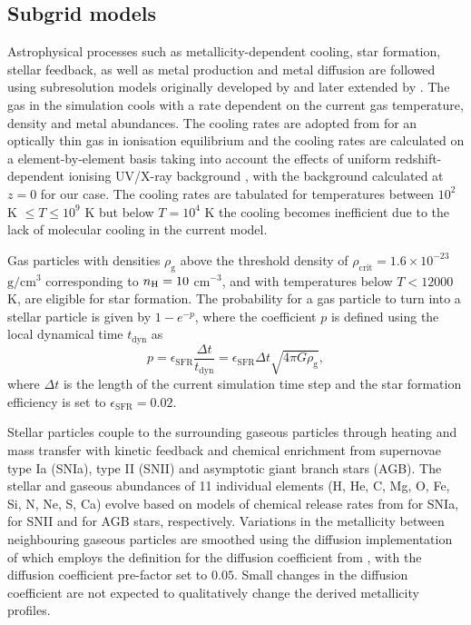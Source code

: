 \documentclass[a4paper,fleqn,usenatbib]{mnras}
\begin{document}
\subsection{Subgrid models}

Astrophysical processes such as metallicity-dependent cooling, star formation, 
stellar feedback, as well as metal production and metal diffusion are followed using 
subresolution models originally developed by  \citet{2005MNRAS.364..552S, 2006MNRAS.371.1125S}
and later extended by \citet{2013MNRAS.434.3142A}.
The gas in the simulation cools with a rate dependent on the current gas temperature, density and 
metal abundances. The cooling rates are adopted from \citet{2009MNRAS.393...99W} \citep[see also][]{2013MNRAS.434.3142A} for an 
optically thin gas in ionisation equilibrium and the cooling rates are calculated on a element-by-element basis taking
into account the effects of uniform redshift-dependent ionising UV/X-ray background \citet{2001cghr.confE..64H}, with 
the background calculated at $z=0$ for our case. The cooling rates are tabulated for temperatures between $10^{2}$ K $\le T \le 10^{9}$ K 
but below $T=10^4$ K the cooling becomes inefficient due to the lack of molecular cooling in the current model. 

Gas particles with densities $\rho_\mathrm{g}$ above the threshold density of 
$\rho_\mathrm{crit}=1.6\times10^{-23}$ $\mathrm{g/cm^{3}}$ corresponding to
$n_{\rm H}=10$ cm$^{-3}$, and with temperatures below $T< 12000$ K, are eligible for star formation. The probability 
for a gas particle to turn into a stellar particle is given by $1-e^{-p}$, where the coefficient $p$ 
is defined using the local dynamical time $t_\mathrm{dyn}$ as 
\begin{equation}
 p=\epsilon_\mathrm{SFR}\frac{\Delta t}{t_\mathrm{dyn}}
=\epsilon_\mathrm{SFR}\Delta t \sqrt{4\pi G\rho_\mathrm{g}},
\end{equation}
where $\Delta t$ is the length of the current simulation time step and the star formation 
efficiency is set to $\epsilon_\mathrm{SFR}=0.02$. 

Stellar particles couple to the surrounding gaseous particles through
heating and mass transfer with kinetic
feedback and chemical enrichment from
supernovae type Ia (SNIa), type II (SNII) and asymptotic
giant branch stars (AGB). The stellar and gaseous 
abundances of 11 individual elements (H, He, C, Mg, O, Fe, Si, 
N, Ne, S, Ca) evolve based on models of chemical release rates from \citet{1999ApJS..125..439I} for SNIa, 
\citet{1995ApJS..101..181W} for SNII and \citet{2010MNRAS.403.1413K} for AGB stars, respectively. 
Variations in the metallicity between neighbouring gaseous particles are smoothed using
the diffusion implementation of \citet{2013MNRAS.434.3142A} which employs the definition for the diffusion
coefficient from \citet{2010MNRAS.407.1581S}, with the diffusion coefficient pre-factor set to $0.05$. Small
changes in the diffusion coefficient are not expected to qualitatively change the derived metallicity profiles.
\end{document}
